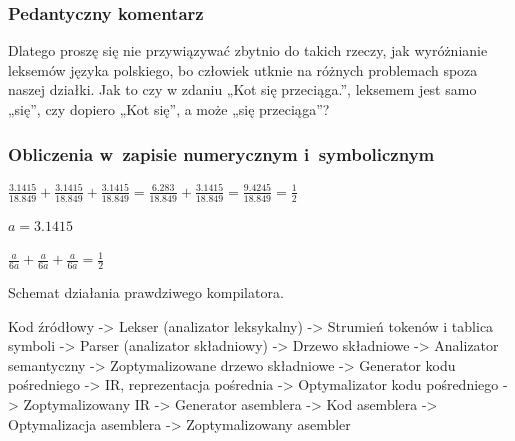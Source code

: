 \documentclass[10pt,t]{beamer}
\begin{document}
\begin{frame}
  \frametitle{Pedantyczny komentarz}




  Dlatego proszę się nie przywiązywać zbytnio do takich rzeczy, jak
  wyróżnianie leksemów języka polskiego, bo człowiek utknie na różnych
  problemach spoza naszej działki. Jak to czy w zdaniu „Kot się przeciąga.”,
  leksemem jest samo „się”, czy dopiero „Kot się”, a może „się przeciąga”?

\end{frame}





\begin{frame}
  \frametitle{Obliczenia w~zapisie numerycznym i~symbolicznym}


  $\displaystyle \frac{ 3.1415 }{ 18.849 } + \frac{ 3.1415 }{ 18.849 } +
  \frac{ 3.1415 }{ 18.849 } = \frac{ 6.283 }{ 18.849 } +
  \frac{ 3.1415 }{ 18.849 } = \frac{ 9.4245 }{ 18.849 } = \frac{ 1 }{ 2 }$

  \vspace{1em}


  $a = 3.1415$

  $\displaystyle \frac{ a }{ 6a } + \frac{ a }{ 6a } + \frac{ a }{ 6a } =
  \frac{ 1 } { 2 }$

  Schemat działania prawdziwego kompilatora.

  Kod źródłowy -> Lekser (analizator leksykalny) -> Strumień tokenów i
  tablica symboli -> Parser (analizator składniowy) -> Drzewo
  składniowe -> Analizator semantyczny -> Zoptymalizowane drzewo składniowe
  -> Generator kodu pośredniego -> IR, reprezentacja pośrednia ->
  Optymalizator kodu pośredniego -> Zoptymalizowany IR -> Generator
  asemblera -> Kod asemblera -> Optymalizacja asemblera ->
  Zoptymalizowany asembler

\end{frame}
\end{document}
